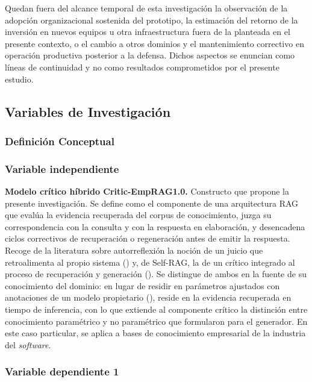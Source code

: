 Quedan fuera del alcance temporal de esta investigación la observación de la adopción organizacional sostenida del prototipo, la estimación del retorno de la inversión en nuevos equipos u otra infraestructura fuera de la planteada en el presente contexto, o el cambio a otros dominios y el mantenimiento correctivo en operación productiva posterior a la defensa. Dichos aspectos se enuncian como líneas de continuidad y no como resultados comprometidos por el presente estudio.

\subsection{Variables de Investigación}

\subsubsection{Definición Conceptual}

\subsubsection*{Variable independiente}

\textbf{Modelo crítico híbrido Critic-EmpRAG1.0.} Constructo que propone la presente investigación. Se define como el componente de una arquitectura RAG que evalúa la evidencia recuperada del corpus de conocimiento, juzga su correspondencia con la consulta y con la respuesta en elaboración, y desencadena ciclos correctivos de recuperación o regeneración antes de emitir la respuesta. Recoge de la literatura sobre autorreflexión la noción de un juicio que retroalimenta al propio sistema (\cite{Shinn2023_Reflexion}) y, de Self-RAG, la de un crítico integrado al proceso de recuperación y generación (\cite{Asai2024_Selfrag}). Se distingue de ambos en la fuente de su conocimiento del dominio: en lugar de residir en parámetros ajustados con anotaciones de un modelo propietario (\cite{jeong_improving_2024}), reside en la evidencia recuperada en tiempo de inferencia, con lo que extiende al componente crítico la distinción entre conocimiento paramétrico y no paramétrico que \textcite{Lewis2020rag} formularon para el generador. En este caso particular, se aplica a bases de conocimiento empresarial de la industria del \textit{software}.

\subsubsection*{Variable dependiente 1}

